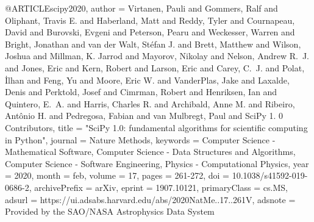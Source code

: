 
@ARTICLE{scipy2020,
       author = {{Virtanen}, Pauli and {Gommers}, Ralf and {Oliphant}, Travis E. and {Haberland}, Matt and {Reddy}, Tyler and {Cournapeau}, David and {Burovski}, Evgeni and {Peterson}, Pearu and {Weckesser}, Warren and {Bright}, Jonathan and {van der Walt}, St{\'e}fan J. and {Brett}, Matthew and {Wilson}, Joshua and {Millman}, K. Jarrod and {Mayorov}, Nikolay and {Nelson}, Andrew R.~J. and {Jones}, Eric and {Kern}, Robert and {Larson}, Eric and {Carey}, C.~J. and {Polat}, {\.I}lhan and {Feng}, Yu and {Moore}, Eric W. and {VanderPlas}, Jake and {Laxalde}, Denis and {Perktold}, Josef and {Cimrman}, Robert and {Henriksen}, Ian and {Quintero}, E.~A. and {Harris}, Charles R. and {Archibald}, Anne M. and {Ribeiro}, Ant{\^o}nio H. and {Pedregosa}, Fabian and {van Mulbregt}, Paul and {SciPy 1. 0 Contributors}},
        title = "{SciPy 1.0: fundamental algorithms for scientific computing in Python}",
      journal = {Nature Methods},
     keywords = {Computer Science - Mathematical Software, Computer Science - Data Structures and Algorithms, Computer Science - Software Engineering, Physics - Computational Physics},
         year = 2020,
        month = feb,
       volume = {17},
        pages = {261-272},
          doi = {10.1038/s41592-019-0686-2},
archivePrefix = {arXiv},
       eprint = {1907.10121},
 primaryClass = {cs.MS},
       adsurl = {https://ui.adsabs.harvard.edu/abs/2020NatMe..17..261V},
      adsnote = {Provided by the SAO/NASA Astrophysics Data System}
}
